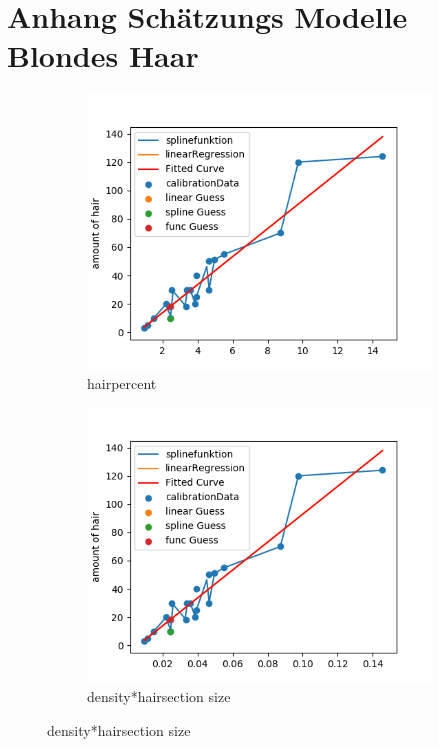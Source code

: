 \documentclass[german,a4paper, 12pt]{llncs}
\begin{document}
\section{Anhang Schätzungs Modelle Blondes Haar}
\label{appendix:Blond}
\begin{figure}[H] %
	\begin{subfigure}{0.48\textwidth}
		\includegraphics[width=1.1\linewidth]{figBina/g1.png}
		\caption{hairpercent} \label{fig:a}
	\end{subfigure}\hspace*{\fill}
	\begin{subfigure}{0.48\textwidth}
		\includegraphics[width=1.1\linewidth]{figBina/g2.png}
		\caption{density*hairsection size} \label{fig:b}
	\end{subfigure}
	

\end{figure}
\end{document}

